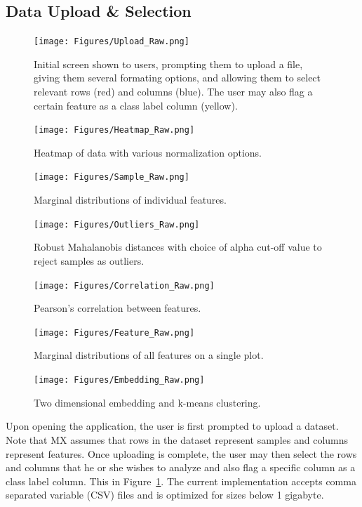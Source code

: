 \documentclass[12pt]{article}
\begin{document}
\subsection{Data Upload \& Selection}
\label{subsec:SubSecUpload}

\begin{figure}
	\centering
	\texttt{[image: Figures/Upload\_Raw.png]}
	\caption{Initial screen shown to users, prompting them to upload a file, giving them several formating options, and allowing them to select relevant rows (red) and columns (blue). The user may also flag a certain feature as a class label column (yellow).}
	\label{fig:FigUpload}
\end{figure}
\begin{figure}
	\centering
	\texttt{[image: Figures/Heatmap\_Raw.png]}
	\caption{Heatmap of data with various normalization options.}
	\label{fig:FigHeatmap}
\end{figure}
\begin{figure}
	\centering
	\texttt{[image: Figures/Sample\_Raw.png]}
	\caption{Marginal distributions of individual features.}
	\label{fig:FigSample}
\end{figure}
\begin{figure}
	\centering
	\texttt{[image: Figures/Outliers\_Raw.png]}
	\caption{Robust Mahalanobis distances with choice of alpha cut-off value to reject samples as outliers.}
	\label{fig:FigOutliers}
\end{figure}
\begin{figure}
	\centering
	\texttt{[image: Figures/Correlation\_Raw.png]}
	\caption{Pearson's correlation between features.}
	\label{fig:FigCorrelation}
\end{figure}
\begin{figure}
	\centering
	\texttt{[image: Figures/Feature\_Raw.png]}
	\caption{Marginal distributions of all features on a single plot.}
	\label{fig:FigFeature}
\end{figure}
\begin{figure}
	\centering
	\texttt{[image: Figures/Embedding\_Raw.png]}
	\caption{Two dimensional embedding and k-means clustering.}
	\label{fig:FigEmbedding}
\end{figure}

Upon opening the application, the user is first prompted to upload a dataset. Note that MX assumes that rows in the dataset represent samples and columns represent features. Once uploading is complete, the user may then select the rows and columns that he or she wishes to analyze and also flag a specific column as a class label column. This in Figure~\ref{fig:FigUpload}. The current implementation accepts comma separated variable (CSV) files and is optimized for sizes below 1 gigabyte.
\end{document}
